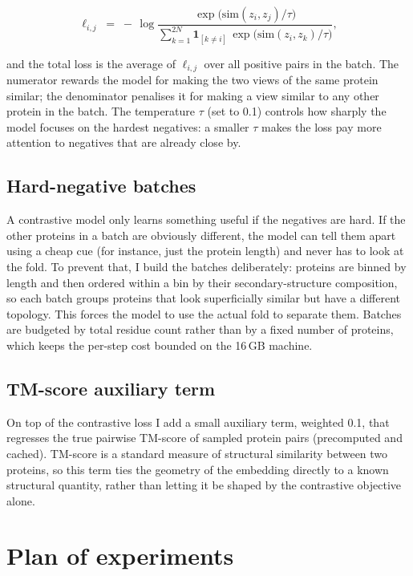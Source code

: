 \documentclass[11pt,a4paper]{article}
\theoremstyle{definition}
\begin{document}
\begin{equation*}
\ell_{i,j} \;=\; -\,\log
\frac{\exp\!\big(\mathrm{sim}(z_i,z_j)/\tau\big)}
     {\displaystyle\sum_{k=1}^{2N}\mathbf{1}_{[k\neq i]}\,
      \exp\!\big(\mathrm{sim}(z_i,z_k)/\tau\big)} ,
\end{equation*}

and the total loss is the average of $\ell_{i,j}$ over all positive pairs in the
batch. The numerator rewards the model for making the two views of the same
protein similar; the denominator penalises it for making a view similar to any
other protein in the batch. The temperature $\tau$ (set to 0.1) controls how
sharply the model focuses on the hardest negatives: a smaller $\tau$ makes the
loss pay more attention to negatives that are already close by.

\subsection{Hard-negative batches}

A contrastive model only learns something useful if the negatives are hard. If
the other proteins in a batch are obviously different, the model can tell them
apart using a cheap cue (for instance, just the protein length) and never has to
look at the fold. To prevent that, I build the batches deliberately: proteins are
binned by length and then ordered within a bin by their secondary-structure
composition, so each batch groups proteins that look superficially similar but
have a different topology. This forces the model to use the actual fold to
separate them. Batches are budgeted by total residue count rather than by a fixed
number of proteins, which keeps the per-step cost bounded on the 16\,GB machine.

\subsection{TM-score auxiliary term}

On top of the contrastive loss I add a small auxiliary term, weighted 0.1, that
regresses the true pairwise TM-score of sampled protein pairs (precomputed and
cached). TM-score is a standard measure of structural similarity between two
proteins, so this term ties the geometry of the embedding directly to a known
structural quantity, rather than letting it be shaped by the contrastive
objective alone.

\section{Plan of experiments}
\end{document}
